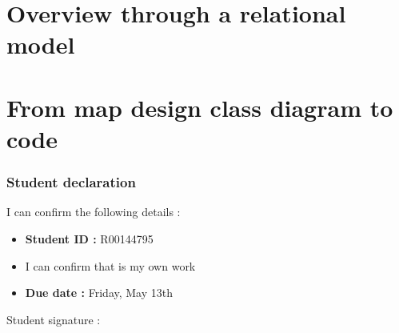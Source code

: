 \documentclass{report}
\begin{document}
\part{Overview through a relational model}
\part{From map design class diagram to code}


\section*{Student declaration}
I can confirm the following details :
\begin{itemize}
\item \textbf{Student ID :} R00144795
\item I can confirm that is my own work
\item \textbf{Due date :} Friday, May 13th
\end{itemize}

Student signature :
\end{document}
